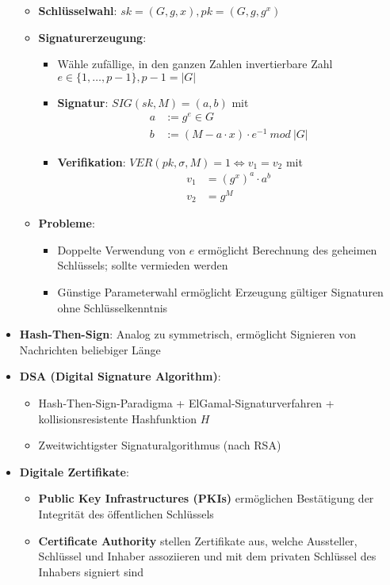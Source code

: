 \begin{itemize}
	\begin{itemize}
		\item \textbf{Schlüsselwahl}: $sk = (G, g, x), pk = (G, g, g^x)$
		\item \textbf{Signaturerzeugung}:
		\begin{itemize}
			\item Wähle zufällige, in den ganzen Zahlen invertierbare Zahl $e \in \{1, \dots, p - 1\}, p - 1 = |G|$
			\item \textbf{Signatur}: $SIG(sk, M) = (a, b)$ mit
			\begin{align*}
				a &:= g^e \in G\\
				b &:= (M - a \cdot x) \cdot e^{-1}\ mod\ |G|
			\end{align*}
			\item \textbf{Verifikation}: $VER(pk, \sigma, M) = 1 \Leftrightarrow v_1 = v_2$ mit
			\begin{align*}
				v_1 &= (g^x)^a \cdot a^b\\
				v_2 &= g^M
			\end{align*}
		\end{itemize}
		\item \textbf{Probleme}:
		\begin{itemize}
			\item Doppelte Verwendung von $e$ ermöglicht Berechnung des geheimen Schlüssels; sollte vermieden werden
			\item Günstige Parameterwahl ermöglicht Erzeugung gültiger  Signaturen ohne Schlüsselkenntnis
		\end{itemize}
	\end{itemize}
	\item \textbf{Hash-Then-Sign}: Analog zu symmetrisch, ermöglicht Signieren von Nachrichten beliebiger Länge
	\item \textbf{DSA (Digital Signature Algorithm)}:
	\begin{itemize}
		\item Hash-Then-Sign-Paradigma + ElGamal-Signaturverfahren + kollisionsresistente Hashfunktion $H$
		\item Zweitwichtigster Signaturalgorithmus (nach RSA)
	\end{itemize}
	\item \textbf{Digitale Zertifikate}:
	\begin{itemize}
		\item \textbf{Public Key Infrastructures (PKIs)} ermöglichen Bestätigung der Integrität des öffentlichen Schlüssels
		\item \textbf{Certificate Authority} stellen Zertifikate aus, welche Aussteller, Schlüssel und Inhaber assoziieren und mit dem privaten Schlüssel des Inhabers signiert sind

\end{itemize}
\end{itemize}
